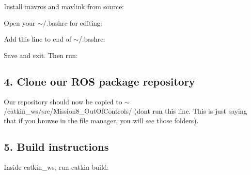 Install {\ttfamily mavros} and {\ttfamily mavlink} from source\+: 
\begin{DoxyCode}{0}
\DoxyCodeLine{}
\DoxyCodeLine{}
\end{DoxyCode}


Open your {\ttfamily $\sim$/.bashrc} for editing\+: 
\begin{DoxyCode}{0}
\end{DoxyCode}


Add this line to end of {\ttfamily $\sim$/.bashrc}\+: 
\begin{DoxyCode}{0}
\end{DoxyCode}
 Save and exit. Then run\+: 
\begin{DoxyCode}{0}
\end{DoxyCode}


\subsection*{4. Clone our R\+OS package repository}


\begin{DoxyCode}{0}
\end{DoxyCode}
 Our repository should now be copied to {\ttfamily $\sim$/catkin\+\_\+ws/src/\+Mission8\+\_\+\+Out\+Of\+Controls/} (don\textquotesingle{}t run this line. This is just saying that if you browse in the file manager, you will see those folders).

\subsection*{5. Build instructions}

Inside {\ttfamily catkin\+\_\+ws}, run {\ttfamily catkin build}\+:


\begin{DoxyCode}{0}
\end{DoxyCode}


